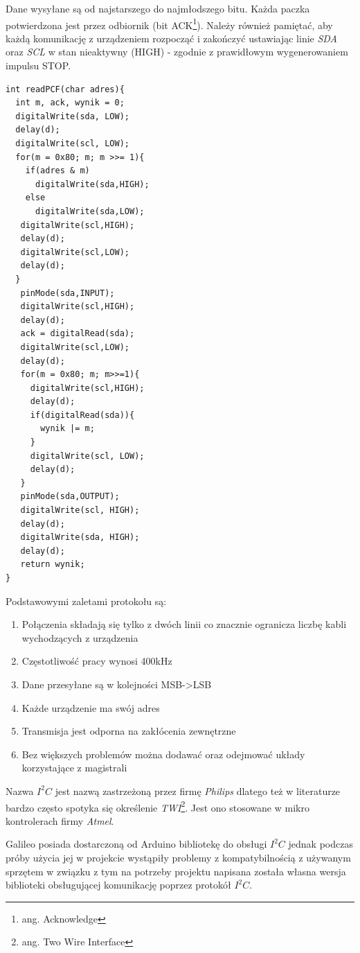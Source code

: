 \documentclass{xmgr}
\begin{document}
Dane wysyłane są od najstarszego do najmłodszego bitu. Każda paczka potwierdzona jest przez odbiornik (bit ACK\footnote{ang. Acknowledge}). Należy również pamiętać, aby każdą komunikację z urządzeniem rozpocząć i zakończyć ustawiając linie \emph{SDA} oraz \emph{SCL} w stan nieaktywny (HIGH) - zgodnie z prawidłowym wygenerowaniem impulsu STOP.

\begin{lstlisting}[label=bot-dirs-alg,caption=Odebranie danych z użyciem protokołu $I^2C$ na przykładzie PCF8574N]
int readPCF(char adres){
  int m, ack, wynik = 0;
  digitalWrite(sda, LOW);
  delay(d);
  digitalWrite(scl, LOW);
  for(m = 0x80; m; m >>= 1){
    if(adres & m)
      digitalWrite(sda,HIGH);
    else
      digitalWrite(sda,LOW);
   digitalWrite(scl,HIGH);
   delay(d);
   digitalWrite(scl,LOW);
   delay(d);
  }
   pinMode(sda,INPUT);
   digitalWrite(scl,HIGH);
   delay(d);
   ack = digitalRead(sda);
   digitalWrite(scl,LOW);
   delay(d);
   for(m = 0x80; m; m>>=1){
     digitalWrite(scl,HIGH);
     delay(d);
     if(digitalRead(sda)){
       wynik |= m;
     }
     digitalWrite(scl, LOW);
     delay(d);
   }
   pinMode(sda,OUTPUT);
   digitalWrite(scl, HIGH);
   delay(d);
   digitalWrite(sda, HIGH);
   delay(d);
   return wynik;
}
\end{lstlisting}

Podstawowymi zaletami protokołu są:
\begin{enumerate}
	\item Połączenia składają się tylko z dwóch linii co znacznie ogranicza liczbę kabli wychodzących z urządzenia
	\item Częstotliwość pracy wynosi 400kHz
	\item Dane przesyłane są w kolejności MSB->LSB
	\item Każde urządzenie ma swój adres	
	\item Transmisja jest odporna na zakłócenia zewnętrzne
	\item Bez większych problemów można dodawać oraz odejmować układy korzystające z magistrali
\end{enumerate}

Nazwa $I^2C$ jest nazwą zastrzeżoną przez firmę \emph{Philips} dlatego też w literaturze bardzo często spotyka się określenie \emph{TWI}\footnote{ang. Two Wire Interface}. Jest ono stosowane w mikro kontrolerach firmy \emph{Atmel}. 

Galileo posiada dostarczoną od Arduino bibliotekę do obsługi $I^2C$ jednak podczas próby użycia jej w projekcie wystąpiły problemy z kompatybilnością z używanym sprzętem w związku z tym na potrzeby projektu napisana została własna wersja biblioteki obsługującej komunikację poprzez protokół $I^2C$.
\end{document}
